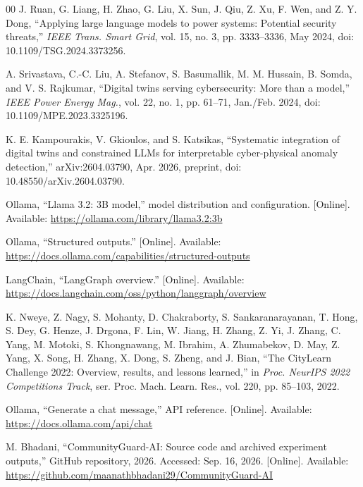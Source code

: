 \documentclass[conference]{IEEEtran}
\begin{document}
\begin{thebibliography}{00}
J. Ruan, G. Liang, H. Zhao, G. Liu, X. Sun, J. Qiu, Z. Xu,
F. Wen, and Z. Y. Dong,
``Applying large language models to power systems: Potential security
threats,'' \emph{IEEE Trans. Smart Grid}, vol. 15, no. 3,
pp. 3333--3336, May 2024,
doi: 10.1109/TSG.2024.3373256.

A. Srivastava, C.-C. Liu, A. Stefanov, S. Basumallik,
M. M. Hussain, B. Somda, and V. S. Rajkumar,
``Digital twins serving cybersecurity: More than a model,''
\emph{IEEE Power Energy Mag.}, vol. 22, no. 1, pp. 61--71,
Jan./Feb. 2024, doi: 10.1109/MPE.2023.3325196.

K. E. Kampourakis, V. Gkioulos, and S. Katsikas,
``Systematic integration of digital twins and constrained LLMs for
interpretable cyber-physical anomaly detection,''
arXiv:2604.03790, Apr. 2026, preprint,
doi: 10.48550/arXiv.2604.03790.

Ollama, ``Llama 3.2: 3B model,'' model distribution and configuration. [Online]. Available: \url{https://ollama.com/library/llama3.2:3b}

Ollama, ``Structured outputs.'' [Online]. Available: \url{https://docs.ollama.com/capabilities/structured-outputs}

LangChain,
``LangGraph overview.'' [Online].
Available: \url{https://docs.langchain.com/oss/python/langgraph/overview}

K. Nweye, Z. Nagy, S. Mohanty, D. Chakraborty,
S. Sankaranarayanan, T. Hong, S. Dey, G. Henze, J. Drgona,
F. Lin, W. Jiang, H. Zhang, Z. Yi, J. Zhang, C. Yang,
M. Motoki, S. Khongnawang, M. Ibrahim, A. Zhumabekov,
D. May, Z. Yang, X. Song, H. Zhang, X. Dong, S. Zheng,
and J. Bian,
``The CityLearn Challenge 2022: Overview, results, and lessons
learned,'' in \emph{Proc. NeurIPS 2022 Competitions Track},
ser. Proc. Mach. Learn. Res., vol. 220, pp. 85--103, 2022.

Ollama, ``Generate a chat message,'' API reference. [Online]. Available: \url{https://docs.ollama.com/api/chat}

M. Bhadani,
``CommunityGuard-AI: Source code and archived experiment outputs,''
GitHub repository, 2026.
Accessed: Sep. 16, 2026. [Online]. Available:
\url{https://github.com/maanathbhadani29/CommunityGuard-AI}
\end{thebibliography}
\end{document}
